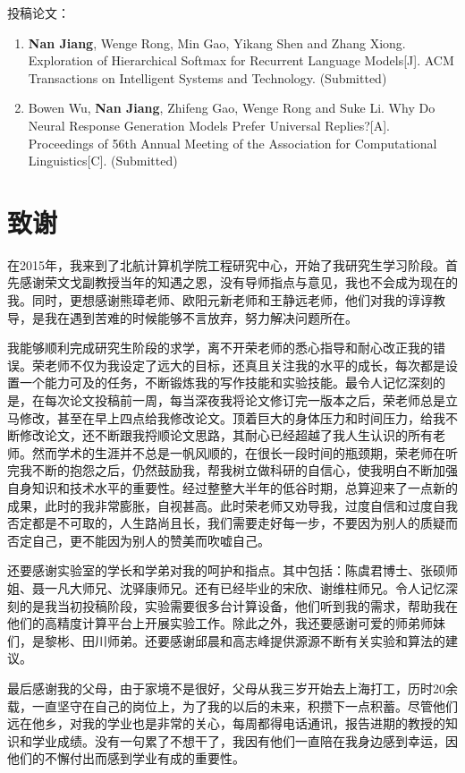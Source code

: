 \noindent 投稿论文：
\begin{enumerate}[label=\arabic*]
\item \textbf{Nan Jiang}, Wenge Rong, Min Gao, Yikang Shen and Zhang Xiong. Exploration of Hierarchical Softmax for Recurrent Language Models[J]. ACM Transactions on Intelligent Systems and Technology. (Submitted)
\item Bowen Wu, \textbf{Nan Jiang}, Zhifeng Gao, Wenge Rong and Suke Li. Why Do Neural Response Generation Models Prefer Universal Replies?[A]. Proceedings of 56th Annual Meeting of the Association for Computational Linguistics[C]. (Submitted)
\end{enumerate}
\chapter{致\quad 谢}
在2015年，我来到了北航计算机学院工程研究中心，开始了我研究生学习阶段。首先感谢荣文戈副教授当年的知遇之恩，没有导师指点与意见，我也不会成为现在的我。同时，更想感谢熊璋老师、欧阳元新老师和王静远老师，他们对我的谆谆教导，是我在遇到苦难的时候能够不言放弃，努力解决问题所在。

我能够顺利完成研究生阶段的求学，离不开荣老师的悉心指导和耐心改正我的错误。荣老师不仅为我设定了远大的目标，还真且关注我的水平的成长，每次都是设置一个能力可及的任务，不断锻炼我的写作技能和实验技能。最令人记忆深刻的是，在每次论文投稿前一周，每当深夜我将论文修订完一版本之后，荣老师总是立马修改，甚至在早上四点给我修改论文。顶着巨大的身体压力和时间压力，给我不断修改论文，还不断跟我捋顺论文思路，其耐心已经超越了我人生认识的所有老师。然而学术的生涯并不总是一帆风顺的，在很长一段时间的瓶颈期，荣老师在听完我不断的抱怨之后，仍然鼓励我，帮我树立做科研的自信心，使我明白不断加强自身知识和技术水平的重要性。经过整整大半年的低谷时期，总算迎来了一点新的成果，此时的我非常膨胀，自视甚高。此时荣老师又劝导我，过度自信和过度自我否定都是不可取的，人生路尚且长，我们需要走好每一步，不要因为别人的质疑而否定自己，更不能因为别人的赞美而吹嘘自己。


还要感谢实验室的学长和学弟对我的呵护和指点。其中包括：陈虞君博士、张硕师姐、聂一凡大师兄、沈驿康师兄。还有已经毕业的宋欣、谢维柱师兄。令人记忆深刻的是我当初投稿阶段，实验需要很多台计算设备，他们听到我的需求，帮助我在他们的高精度计算平台上开展实验工作。除此之外，我还要感谢可爱的师弟师妹们，是黎彬、田川师弟。还要感谢邱晨和高志峰提供源源不断有关实验和算法的建议。

最后感谢我的父母，由于家境不是很好，父母从我三岁开始去上海打工，历时20余载，一直坚守在自己的岗位上，为了我的以后的未来，积攒下一点积蓄。尽管他们远在他乡，对我的学业也是非常的关心，每周都得电话通讯，报告进期的教授的知识和学业成绩。没有一句累了不想干了，我因有他们一直陪在我身边感到幸运，因他们的不懈付出而感到学业有成的重要性。